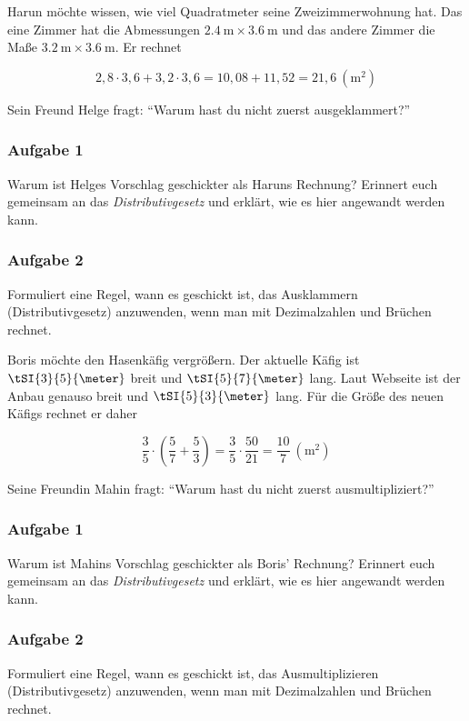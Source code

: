 \documentclass[10pt, a5paper, landscape]{scrartcl}
\begin{document}
\clearpage
\ReiheTitel

Harun möchte wissen, wie viel Quadratmeter seine Zweizimmerwohnung hat. Das eine Zimmer hat die Abmessungen $\SI{2,4}{\meter} \times  \SI{3,6}{\meter}$ und das andere Zimmer die Maße $\SI{3,2}{\meter}\times \SI{3,6}{\meter}$. Er rechnet 

\[ 2,8\cdot 3,6 + 3,2\cdot 3,6 = 10,08 + 11,52 = 21,6\ (\si{\square\meter}) \]

Sein Freund Helge fragt: \enquote{Warum hast du nicht zuerst ausgeklammert?}

\subsubsection*{Aufgabe 1}
Warum ist Helges Vorschlag geschickter als Haruns Rechnung? Erinnert euch gemeinsam an das \emph{Distributivgesetz} und erklärt, wie es hier angewandt werden kann.

\subsubsection*{Aufgabe 2}
Formuliert eine Regel, wann es geschickt ist, das Ausklammern (Distributivgesetz) anzuwenden, wenn man mit Dezimalzahlen und Brüchen rechnet.

\clearpage
\ReiheTitel

Boris möchte den Hasenkäfig vergrößern. Der aktuelle Käfig ist $\tSI{3}{5}{\meter}$ breit und $\tSI{5}{7}{\meter}$ lang. Laut Webseite ist der Anbau genauso breit und $\tSI{5}{3}{\meter}$ lang. Für die Größe des neuen Käfigs rechnet er daher

\[ \dfrac{3}{5}\cdot (\dfrac{5}{7} + \dfrac{5}{3}) = \dfrac{3}{5}\cdot \dfrac{50}{21} = \dfrac{10}{7}\ (\si{\square\meter}) \]

Seine Freundin Mahin fragt: \enquote{Warum hast du nicht zuerst ausmultipliziert?}

\subsubsection*{Aufgabe 1}
Warum ist Mahins Vorschlag geschickter als Boris' Rechnung? Erinnert euch gemeinsam an das \emph{Distributivgesetz} und erklärt, wie es hier angewandt werden kann.

\subsubsection*{Aufgabe 2}
Formuliert eine Regel, wann es geschickt ist, das Ausmultiplizieren (Distributivgesetz) anzuwenden, wenn man mit Dezimalzahlen und Brüchen rechnet.
\end{document}
